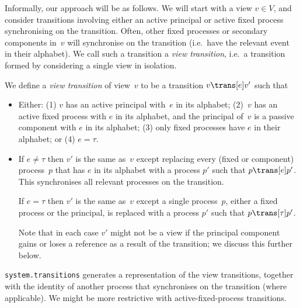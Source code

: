 Informally, our approach will be as follows.  We will start with a view $v \in
V$, and consider transitions involving either an active principal or active
fixed process synchronising on the transition.  Often, other fixed processes
or secondary components in~$v$ will synchronise on the transition (i.e.~have
the relevant event in their alphabet).  We call such a transition a \emph{view
  transition}, i.e.~a transition formed by considering a single view in
isolation.
%
\begin{definition}
We define a \emph{view transition} of view~$v$ to be a transition $v \trans[e]
v'$ such that
%
\begin{itemize}
\item Either: (1) $v$ has an active principal with~$e$ in its alphabet; (2)~$v$
  has an active fixed process with $e$ in its alphabet, and the principal
  of~$v$ is a passive component with $e$ in its alphabet; (3) only fixed
  processes have $e$ in their alphabet; or (4) $e = \tau$.

\item If $e \ne \tau$ then $v'$ is the same as~$v$ except replacing every
  (fixed or component) process~$p$ that has $e$ in its alphabet with a process
  $p'$ such that \( p \trans[e] p' \).  This synchronises all relevant
  processes on the transition.

  If $e = \tau$ then $v'$ is the same as~$v$ except a single process~$p$,
  either a fixed process or the principal, is replaced  with a process
  $p'$ such that \( p \trans[\tau] p' \). 

  Note that in each case $v'$ might not be a view if the principal component
  gains or loses a reference as a result of the transition; we discuss this
  further below.
\end{itemize}
\end{definition}

\begin{impNote}
\texttt{system.transitions} generates a representation of the view
  transitions, together with the identity of another process that synchronises
  on the transition (where applicable).  We might be more restrictive with
  active-fixed-process transitions. 
\end{impNote}

